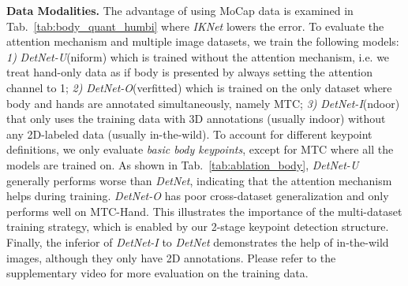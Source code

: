 \documentclass[final]{cvpr}
\begin{document}
\par
\noindent \textbf{Data Modalities.}
The advantage of using MoCap data is examined in Tab.~\ref{tab:body_quant_humbi} where \textit{IKNet} lowers the error.
To evaluate the attention mechanism and multiple image datasets, we train the following models:
\textit{1)} \textit{DetNet-U}(niform) which is trained without the attention mechanism, i.e. we treat hand-only data as if body is presented by always setting the attention channel to 1;
\textit{2)} \textit{DetNet-O}(verfitted) which is trained on the only dataset where body and hands are annotated simultaneously, namely MTC;
\textit{3)} \textit{DetNet-I}(ndoor) that only uses the training data with 3D annotations (usually indoor) without any 2D-labeled data (usually in-the-wild).
To account for different keypoint definitions, we only evaluate \textit{basic body keypoints}, except for MTC where all the models are trained on.
As shown in Tab.~\ref{tab:ablation_body}, \textit{DetNet-U} generally performs worse than \textit{DetNet}, indicating that the attention mechanism helps during training.
\textit{DetNet-O} has poor cross-dataset generalization and only performs well on MTC-Hand.
This illustrates the importance of the multi-dataset training strategy, which is enabled by our 2-stage keypoint detection structure.
Finally, the inferior of \textit{DetNet-I} to \textit{DetNet} demonstrates the help of in-the-wild images, although they only have 2D annotations.
Please refer to the supplementary video for more evaluation on the training data.
\begin{table}[t]
  \caption{
Ablation study on training data.
The gap between \textit{DetNet-U} and \textit{DetNet} shows the help of the attention mechanism.
\textit{DetNet-O} and \textit{DetNet-I} only perform well on a few datasets, while \textit{DetNet} has the best cross-dataset accuracy.
}
	\label{tab:ablation_body}
\end{table}
\end{document}
